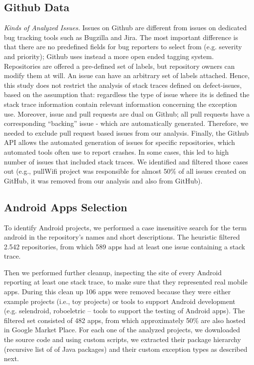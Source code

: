 \documentclass[conference]{IEEEtran}
\begin{document}
\subsection{Github Data}
\label{sec:git}

\noindent\emph{Kinds of Analyzed Issues.} Issues on Github are different from
issues on dedicated bug tracking tools such as Bugzilla and Jira. The most
important difference is that there are no predefined fields for bug reporters to
select from (e.g. severity and priority); Github uses instead a more open ended
tagging system. Repositories are offered a pre-defined set of labels, but
repository owners can modify them at will. An issue can have an arbitrary set of
labels attached. Hence, this study does not restrict the analysis of stack
traces defined on defect-issues, based on the assumption that: regardless the
type of issue where its is defined the stack trace information contain relevant
information concerning the exception use. Moreover, issue and pull requests are
dual on Github; all pull requests have a corresponding ``backing'' issue - which
are automatically generated. Therefore, we needed to exclude pull request based
issues from our analysis. Finally, the Github API allows the automated
generation of issues for specific repositories, which automated tools often use
to report crashes. In some cases, this led to high number of issues that
included stack traces. We identified and filtered those cases out (e.g.,
pullWifi project was responsible for almost 50\% of all issues created on
GitHub, it was removed from our analysis and also from GitHub).

\subsection{Android Apps Selection}
\label{sec:android}

To identify Android projects, we performed a case insensitive search for the
term \textsf{android} in the repository's names and short descriptions.  The
heuristic filtered 2.542 repositories, from which 589 apps had at least one
issue containing a stack trace.

Then we performed further cleanup, inspecting the site of every Android
reporting at least one stack trace, to make sure that they represented real
mobile apps. During this clean up 106 apps were removed because they were either
example projects (i.e., toy projects) or tools to support Android development
(e.g. selendroid, roboeletric -- tools to support the testing of Android apps).
The filtered set consisted of 482 apps, from which approximately 50\% are also
hosted in Google Market Place. For each one of the analyzed projects, we
downloaded the source code and using custom scripts, we extracted their package
hierarchy (recursive list of of Java packages) and their custom exception types
as described next.
\end{document}
